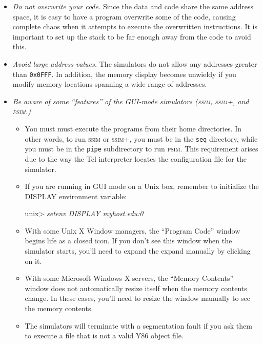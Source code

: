 \documentclass[11pt]{article}
\begin{document}
\begin{itemize}
\item {\em Do not overwrite your code.}  Since the data and code share
the same address space, it is easy to have a program overwrite some of
the code, causing complete chaos when it attempts to execute the
overwritten instructions.  It is important to set up the stack to be
far enough away from the code to avoid this.

\item {\em Avoid large address values.}  The simulators do not allow
any addresses greater than \texttt{0x0FFF}.  In addition, the memory
display becomes unwieldy if you modify memory locations spanning a
wide range of addresses.

\item {\em Be aware of some ``features'' of the GUI-mode simulators
(\textsc{ssim}, \textsc{ssim+}, and \textsc{psim}.)}
\begin{itemize}
\item
You must must execute the programs from their home directories.  In
other words, to run \textsc{ssim} or \textsc{ssim+}, you must be in
the \texttt{seq} directory, while you must be in the \texttt{pipe}
subdirectory to run \textsc{psim}.  This requirement arises due to the
way the Tcl interpreter locates the configuration file for
the simulator.

\item If you are running in GUI mode on a Unix box, remember to
initialize the DISPLAY environment variable:
\begin{tty}
unix> {\em setenv DISPLAY myhost.edu:0}
\end{tty}

\item With some Unix X Window managers, the ``Program Code'' window 
begins life as a closed icon. If you don't see this window when the
simulator starts, you'll need to expand the expand manually by
clicking on it.

\item With some Microsoft Windows X servers, the ``Memory Contents'' window
does not automatically resize itself when the memory contents change.
In these cases, you'll need to resize the window manually to see the
memory contents.

\item The simulators 
will terminate with a segmentation fault if you ask them to execute a file
that is not a valid Y86 object file.
\end{itemize}

\end{itemize}
\end{document}
